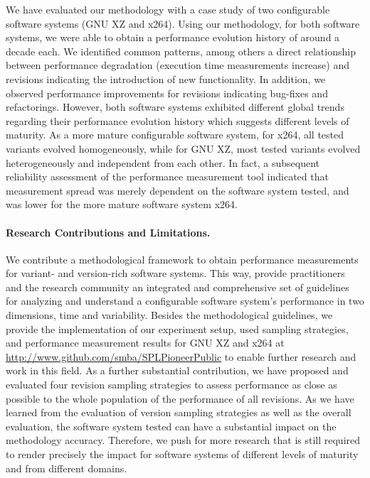 We have evaluated our methodology with a case study of two configurable software
systems (GNU XZ and x264). Using our methodology, for both software systems, we
were able to obtain a performance evolution history  of around a decade each.
We identified common patterns, among others a direct relationship between
performance degradation (execution time measurements increase) and revisions
indicating the introduction of new functionality. In addition, we observed
performance improvements for revisions indicating bug-fixes and refactorings.
However, both software systems exhibited different global trends regarding
their performance evolution history which suggests different levels of
maturity. As a more mature configurable software system, for x264, all tested
variants evolved homogeneously, while for GNU XZ, most tested variants evolved
heterogeneously and independent from each other. In fact, a subsequent
reliability assessment of the performance measurement tool indicated that
measurement spread was merely dependent on the software system tested, and was
lower for the more mature software system x264.

\paragraph{Research Contributions and Limitations.} We contribute a
methodological framework to obtain performance measurements for variant- and
version-rich software systems. This way, provide practitioners and the
research community an integrated and comprehensive set of guidelines for
analyzing and understand a configurable software system’s performance in two
dimensions, time and variability. Besides the methodological guidelines, we
provide the implementation of our experiment setup, used sampling strategies,
and performance measurement results for GNU XZ and x264 at
\url{http://www.github.com/smba/SPLPioneerPublic} to enable further research
and work in this field. As a further substantial contribution, we have proposed and
evaluated four revision sampling strategies to assess performance as close as
possible to the whole population of the performance of all revisions.
As we have learned from the evaluation of version sampling strategies as well
as the overall evaluation, the software system tested can have a substantial
impact on the methodology accuracy. Therefore, we push for more research that
is still required to render precisely the impact for software systems of
different levels of maturity and from different domains.

